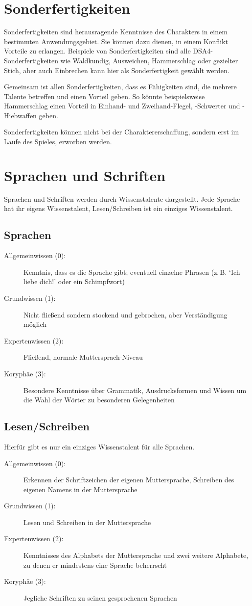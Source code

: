 \section{Sonderfertigkeiten}
Sonderfertigkeiten sind herausragende Kenntnisse des Charakters in einem bestimmten Anwendungsgebiet. Sie können dazu dienen, in einem Konflikt Vorteile zu erlangen. Beispiele von Sonderfertigkeiten sind alle DSA4-Sonderfertigkeiten wie Waldkundig, Ausweichen, Hammerschlag oder gezielter Stich, aber auch Einbrechen kann hier als Sonderfertigkeit gewählt werden.

Gemeinsam ist allen Sonderfertigkeiten, dass es Fähigkeiten sind, die mehrere Talente betreffen und einen Vorteil geben. So könnte beispielsweise Hammerschlag einen Vorteil in Einhand- und Zweihand-Flegel, -Schwerter und -Hiebwaffen geben.

Sonderfertigkeiten können nicht bei der Charaktererschaffung, sondern erst im Laufe des Spieles, erworben werden.



\section{Sprachen und Schriften}
Sprachen und Schriften werden durch Wissenstalente dargestellt. Jede Sprache hat ihr eigens Wissenstalent, Lesen/Schreiben ist ein einziges Wissenstalent.

\subsection{Sprachen}
\begin{description}
\item[Allgemeinwissen (0):] Kenntnis, dass es die Sprache gibt; eventuell einzelne Phrasen (z.\,B. `Ich liebe dich!' oder ein Schimpfwort)
\item[Grundwissen (1):] Nicht fließend sondern stockend und gebrochen, aber Verständigung möglich
\item[Expertenwissen (2):] Fließend, normale Muttersprach-Niveau
\item[Koryphäe (3):] Besondere Kenntnisse über Grammatik, Ausdrucksformen und Wissen um die Wahl der Wörter zu besonderen Gelegenheiten
\end{description}

\subsection{Lesen/Schreiben}
Hierfür gibt es nur ein einziges Wissenstalent für alle Sprachen.
\begin{description}
\item[Allgemeinwissen (0):] Erkennen der Schriftzeichen der eigenen Muttersprache, Schreiben des eigenen Namens in der Muttersprache
\item[Grundwissen (1):] Lesen und Schreiben in der Muttersprache
\item[Expertenwissen (2):] Kenntnisses des Alphabets der Muttersprache und zwei weitere Alphabete, zu denen er mindestens eine Sprache beherrscht
\item[Koryphäe (3):] Jegliche Schriften zu seinen gesprochenen Sprachen
\end{description}

